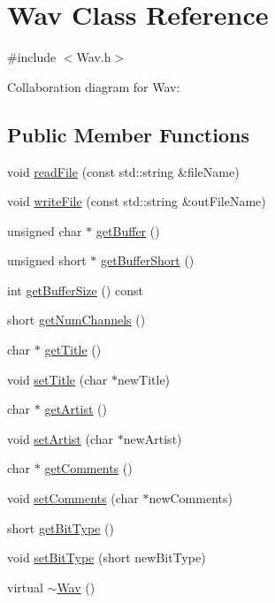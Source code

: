 \hypertarget{classWav}{}\section{Wav Class Reference}
\label{classWav}


{\ttfamily \#include $<$Wav.\+h$>$}



Collaboration diagram for Wav\+:
\subsection*{Public Member Functions}
\begin{DoxyCompactItemize}
\item 
void \hyperlink{classWav_a1c4230cec49d30147a5b8a1950083f7c}{read\+File} (const std\+::string \&file\+Name)
\item 
void \hyperlink{classWav_ad86f4a21d36719ae375ea2586f9f591f}{write\+File} (const std\+::string \&out\+File\+Name)
\item 
unsigned char $\ast$ \hyperlink{classWav_a2daf07a90ed34789e3a1874973d9bd36}{get\+Buffer} ()
\item 
unsigned short $\ast$ \hyperlink{classWav_aae0134529648af492714daada51fb728}{get\+Buffer\+Short} ()
\item 
int \hyperlink{classWav_a71fdfa1d9f5e7c1b86f07bbff4249dca}{get\+Buffer\+Size} () const
\item 
short \hyperlink{classWav_a5450e63d090ea1d41aced0ccf4c60f36}{get\+Num\+Channels} ()
\item 
char $\ast$ \hyperlink{classWav_a7df708b3c8f91b9fb3ddc60a681a7f4f}{get\+Title} ()
\item 
void \hyperlink{classWav_a5a9ef59fd2c048b07af46e47b8b62a76}{set\+Title} (char $\ast$new\+Title)
\item 
char $\ast$ \hyperlink{classWav_a8704bf014d555855122567dbb75249e7}{get\+Artist} ()
\item 
void \hyperlink{classWav_a9f8d3ea3c801962ac79b328318c95ac2}{set\+Artist} (char $\ast$new\+Artist)
\item 
char $\ast$ \hyperlink{classWav_a753e2b96322fe7789fb7c54adc0f3884}{get\+Comments} ()
\item 
void \hyperlink{classWav_af2ddf6c128bb91c23d124a33a2ea627f}{set\+Comments} (char $\ast$new\+Comments)
\item 
short \hyperlink{classWav_a4e410575086d989e3f52dd56ecf262c8}{get\+Bit\+Type} ()
\item 
void \hyperlink{classWav_a4ba91ed72a52ae6164bef1ba0ce5c548}{set\+Bit\+Type} (short new\+Bit\+Type)
\item 
virtual \hyperlink{classWav_a1510b246ba121b103a60b8e7839af25f}{$\sim$\+Wav} ()
\end{DoxyCompactItemize}

